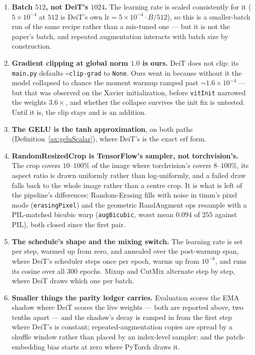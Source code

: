 \begin{enumerate}
\item \textbf{Batch $512$, not DeiT's $1024$.} The learning rate is
  scaled consistently for it ($5\times 10^{-4}$ at $512$ is DeiT's own
  $\mathrm{lr} = 5\times10^{-4}\cdot B/512$), so this is a
  smaller-batch run of the same recipe rather than a mis-tuned one ---
  but it is not the paper's batch, and repeated augmentation interacts
  with batch size by construction.
\item \textbf{Gradient clipping at global norm $1.0$ is ours.} DeiT does
  not clip: its \texttt{main.py} defaults \texttt{--clip-grad} to
  \texttt{None}. Ours went in because without it the model collapsed to
  chance the moment warmup ramped past ${\sim}1.6\times 10^{-4}$ --- but
  that was observed on the Xavier initialization, before \texttt{vitInit}
  narrowed the weights $3.6\times$, and whether the collapse survives the
  init fix is untested. Until it is, the clip stays and is an addition.
\item \textbf{The GELU is the tanh approximation}, on both paths
  (Definition~\ref{ax:geluScalar}), where DeiT's is the exact erf form.
\item \textbf{RandomResizedCrop is TensorFlow's sampler, not
  torchvision's.} The crop covers $10$--$100\%$ of the image where
  torchvision's covers $8$--$100\%$, its aspect ratio is drawn uniformly
  rather than log-uniformly, and a failed draw falls back to the whole
  image rather than a centre crop. It is what is left of the pipeline's
  differences: Random-Erasing fills with noise in timm's pixel mode
  (\texttt{erasingPixel}) and the geometric RandAugment ops resample with
  a PIL-matched bicubic warp (\texttt{augBicubic}, worst mean $0.094$ of
  $255$ against PIL), both closed since the first pair.
\item \textbf{The schedule's shape and the mixing switch.} The learning
  rate is set per step, warmed up from zero, and annealed over the
  post-warmup span, where DeiT's scheduler steps once per epoch, warms up
  from $10^{-6}$, and runs its cosine over all $300$ epochs. Mixup and
  CutMix alternate step by step, where DeiT draws which one per batch.
\item \textbf{Smaller things the parity ledger carries.} Evaluation
  scores the EMA shadow where DeiT scores the live weights --- both are
  reported above, two tenths apart --- and the shadow's decay is ramped in
  from the first step where DeiT's is constant; repeated-augmentation copies are spread by a shuffle window
  rather than placed by an index-level sampler; and the patch-embedding
  bias starts at zero where PyTorch draws it.
\end{enumerate}

